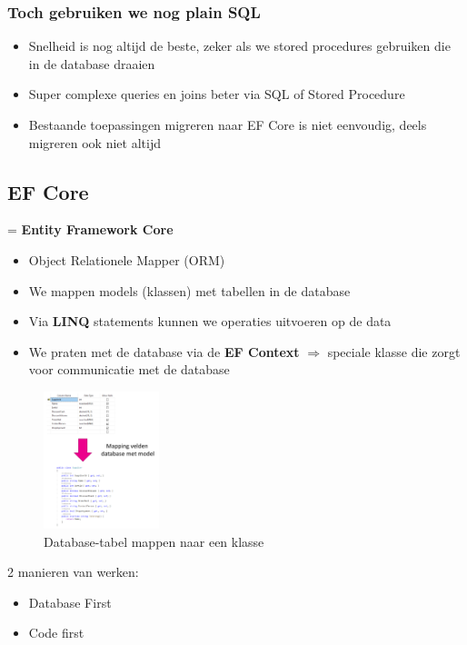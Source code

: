 \documentclass{article}
\begin{document}
\subsubsection{Toch gebruiken we nog plain SQL}

\begin{itemize}
    \item Snelheid is nog altijd de beste, zeker als we stored procedures gebruiken die in de database draaien
    \item Super complexe queries en joins beter via SQL of Stored Procedure
    \item Bestaande toepassingen migreren naar EF Core is niet eenvoudig, deels migreren ook niet altijd
\end{itemize}

\subsection{EF Core}

= \textbf{Entity Framework Core}

\begin{itemize}
    \item Object Relationele Mapper (ORM)
    \item We mappen models (klassen) met tabellen in de database
    \item Via \textbf{LINQ} statements kunnen we operaties uitvoeren op de data
    \item We praten met de database via de \textbf{EF Context} $\Rightarrow$ speciale klasse die zorgt voor communicatie met de database
\end{itemize}

\begin{figure}[H]
    \centering
    \includegraphics[width=0.3\textwidth]{efcore-mapping.png}
    \caption{Database-tabel mappen naar een klasse}
\end{figure}

2 manieren van werken:

\begin{itemize}
    \item Database First
    \item Code first
\end{itemize}
\end{document}
